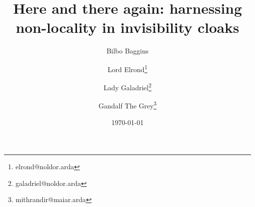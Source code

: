 \usepackage{authblk}
%
\title{Here and there again: harnessing non-locality in invisibility cloaks}
%
\author[1,2]{Bilbo Baggins}
\author[2]{Lord Elrond\thanks{elrond@noldor.arda}}
\author[3]{Lady Galadriel\thanks{galadriel@noldor.arda}}
\author[4]{Gandalf The Grey\thanks{mithrandir@maiar.arda}}
%
\date{\today}